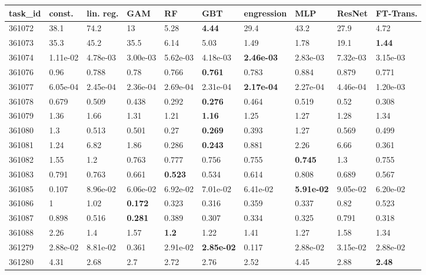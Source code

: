 \begin{table}[ht!]
\centering
\begingroup\footnotesize
\begin{tabular}{llllllllll}
  \hline
\hline
task\_id & const. & lin. reg. & GAM & RF & GBT & engression & MLP & ResNet & FT-Trans. \\ 
  \hline
361072 & 38.1 & 74.2 & 13 & 5.28 & \textbf{4.44} & 29.4 & 43.2 & 27.9 & 4.72 \\ 
  361073 & 35.3 & 45.2 & 35.5 & 6.14 & 5.03 & 1.49 & 1.78 & 19.1 & \textbf{1.44} \\ 
  361074 & 1.11e-02 & 4.78e-03 & 3.00e-03 & 5.62e-03 & 4.18e-03 & \textbf{2.46e-03} & 2.83e-03 & 7.32e-03 & 3.15e-03 \\ 
  361076 & 0.96 & 0.788 & 0.78 & 0.766 & \textbf{0.761} & 0.783 & 0.884 & 0.879 & 0.771 \\ 
  361077 & 6.05e-04 & 2.45e-04 & 2.36e-04 & 2.69e-04 & 2.31e-04 & \textbf{2.17e-04} & 2.27e-04 & 4.46e-04 & 1.20e-03 \\ 
  361078 & 0.679 & 0.509 & 0.438 & 0.292 & \textbf{0.276} & 0.464 & 0.519 & 0.52 & 0.308 \\ 
  361079 & 1.36 & 1.66 & 1.31 & 1.21 & \textbf{1.16} & 1.25 & 1.27 & 1.28 & 1.34 \\ 
  361080 & 1.3 & 0.513 & 0.501 & 0.27 & \textbf{0.269} & 0.393 & 1.27 & 0.569 & 0.499 \\ 
  361081 & 1.24 & 6.82 & 1.86 & 0.286 & \textbf{0.243} & 0.881 & 2.26 & 6.66 & 0.361 \\ 
  361082 & 1.55 & 1.2 & 0.763 & 0.777 & 0.756 & 0.755 & \textbf{0.745} & 1.3 & 0.755 \\ 
  361083 & 0.791 & 0.763 & 0.661 & \textbf{0.523} & 0.534 & 0.614 & 0.808 & 0.689 & 0.567 \\ 
  361085 & 0.107 & 8.96e-02 & 6.06e-02 & 6.92e-02 & 7.01e-02 & 6.41e-02 & \textbf{5.91e-02} & 9.05e-02 & 6.20e-02 \\ 
  361086 & 1 & 1.02 & \textbf{0.172} & 0.323 & 0.316 & 0.359 & 0.337 & 0.82 & 0.523 \\ 
  361087 & 0.898 & 0.516 & \textbf{0.281} & 0.389 & 0.307 & 0.334 & 0.325 & 0.791 & 0.318 \\ 
  361088 & 2.26 & 1.4 & 1.57 & \textbf{1.2} & 1.22 & 1.41 & 1.27 & 1.58 & 1.34 \\ 
  361279 & 2.88e-02 & 8.81e-02 & 0.361 & 2.91e-02 & \textbf{2.85e-02} & 0.117 & 2.88e-02 & 3.15e-02 & 2.88e-02 \\ 
  361280 & 4.31 & 2.68 & 2.7 & 2.72 & 2.76 & 2.52 & 4.45 & 2.88 & \textbf{2.48} \\ 

\end{tabular}
\end{table}
